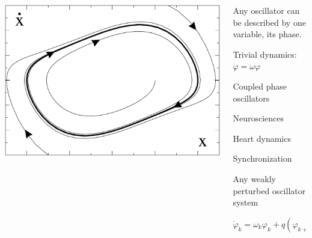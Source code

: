 \begin{frame}[fragile]

 \vspace{2ex}

 \begin{columns}[T]
  \begin{column}{0.35\textwidth}
   \includegraphics[draft=false,width=1.0\textwidth]{vdp.pdf}  
  \end{column}
  \begin{column}{0.63\textwidth}
 Any oscillator can be described by one variable, its phase.

 

 Trivial dynamics: $\dot{\varphi}=\omega \varphi$

 Coupled phase oscillators

 Neurosciences

 Heart dynamics

 Synchronization

 Any weakly perturbed oscillator system

 $\dot{\varphi}_k = \omega_k \varphi_k + q( \varphi_{k+1} , \varphi_k ) + q( \varphi_k , \varphi_{k-1} )$

   
  \end{column}
 \end{columns}

\end{frame}




